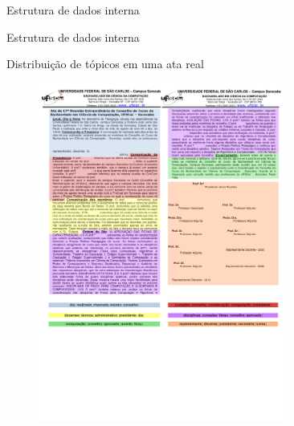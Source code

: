\documentclass[xcolor=table]{beamer}
\begin{document}
\begin{frame}{Estrutura de dados interna}



\end{frame}

\begin{frame}{Estrutura de dados interna}
\end{frame}


\begin{frame}{Distribuição de tópicos em uma ata real}

	\begin{figure}[h!]

		\includegraphics[trim={ 0 235 0 16 },clip,page=1,width=0.73\textwidth]{images/distribuicao.pdf}

	\end{figure}

\end{frame}
\end{document}
